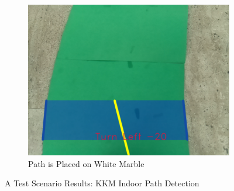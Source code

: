 \documentclass[a4paper,12pt]{article}
\begin{document}
\begin{figure}[H]
\begin{subfigure}{.31\textwidth}
		\centering
		\includegraphics[width=0.30\unitlength]{images/path_images/inside-ww}
		\caption{\label{fig:dataP_inside-ww} Path is Placed on White Marble}
	\end{subfigure}
	\caption{\label{fig:dataP_inside} A Test Scenario Results: KKM Indoor Path Detection}
\end{figure}
\end{document}
